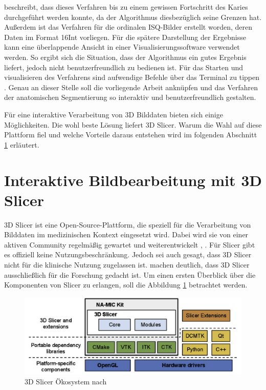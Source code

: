 \citet[S.~55]{hoffmann2020} beschreibt, dass dieses Verfahren bis zu einem gewissen
Fortschritt des Karies durchgeführt werden konnte, da der Algorithmus
diesbezüglich seine Grenzen hat. Außerdem ist das Verfahren für die ordinalen \ac{ISQ}-Bilder
erstellt worden, deren Daten im Format \ac{16Int} vorliegen. Für die spätere Darstellung
der Ergebnisse kann eine überlappende Ansicht in einer Visualisierungssoftware verwendet
werden. So ergibt sich die Situation, dass der Algorithmus ein gutes Ergebnis liefert,
jedoch nicht benutzerfreundlich zu bedienen ist. Für das Starten und visualisieren
des Verfahrens sind aufwendige Befehle über das Terminal zu tippen \citep[vgl.][S.~53]{hoffmann2020}.
Genau an dieser Stelle soll die vorliegende Arbeit anknüpfen und das Verfahren der
anatomischen Segmentierung so interaktiv und benutzerfreundlich gestalten.

Für eine interaktive Verarbeitung von 3D Bilddaten bieten sich einige Möglichkeiten.
Die wohl beste Lösung liefert 3D Slicer. Warum die Wahl auf diese Plattform fiel
und welche Vorteile daraus entstehen wird im folgenden Abschnitt \ref{sec:3d_slicer}
erläutert.

\section{Interaktive Bildbearbeitung mit 3D Slicer}
\label{sec:3d_slicer} 3D Slicer ist eine Open-Source-Plattform, die speziell für
die Verarbeitung von Bilddaten im medizinischen Kontext eingesetzt wird. Dabei wird
sie von einer aktiven Community regelmäßig gewartet und weiterentwickelt \citep[vgl.][]{slicer2024},
\citep[vgl.][S.~1325]{fedorov2012slicer}. Für Slicer gibt es offiziell keine Nutzungsbeschränkung.
Jedoch sei auch gesagt, dass 3D Slicer nicht für die klinische Nutzung zugelassen
ist. \citet[S.~1331]{fedorov2012slicer} machen deutlich, dass 3D Slicer
ausschließlich für die Forschung gedacht ist. Um einen ersten Überblick über die
Komponenten von Slicer zu erlangen, soll die Abbildung
\ref{fig:3d_slicer_oekosystem} betrachtet werden.

\begin{figure}[h]
	\centering
	\includegraphics[width=1\textwidth]{img/3d_slicer_overview.jpg}
	\caption{3D Slicer Ökosystem nach \citet[S.~1326]{fedorov2012slicer}}
	\label{fig:3d_slicer_oekosystem}
\end{figure}

